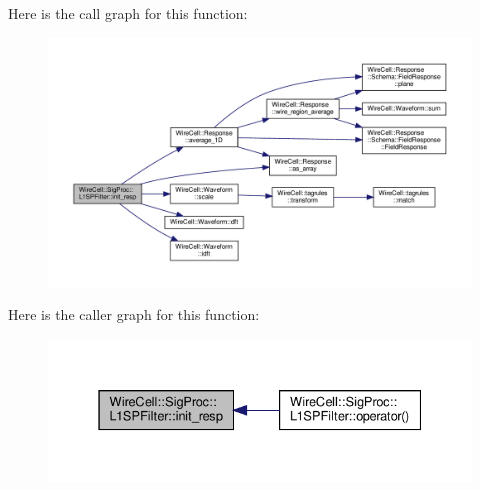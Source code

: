 Here is the call graph for this function\+:
\nopagebreak
\begin{figure}[H]
\begin{center}
\leavevmode
\includegraphics[width=350pt]{class_wire_cell_1_1_sig_proc_1_1_l1_s_p_filter_ad93828b53fee0709cd9649526b5884e7_cgraph}
\end{center}
\end{figure}
Here is the caller graph for this function\+:
\nopagebreak
\begin{figure}[H]
\begin{center}
\leavevmode
\includegraphics[width=331pt]{class_wire_cell_1_1_sig_proc_1_1_l1_s_p_filter_ad93828b53fee0709cd9649526b5884e7_icgraph}
\end{center}
\end{figure}
\mbox{\label{class_wire_cell_1_1_sig_proc_1_1_l1_s_p_filter_a9720ba99e84d3cb4df578eb7ee0e436d}} 
